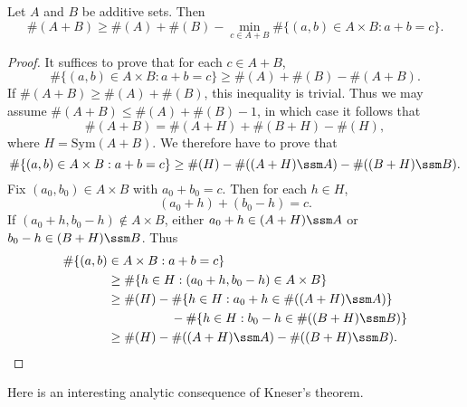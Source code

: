 \begin{theorem}
    Let $A$ and $B$ be additive sets. Then
    \[ \#(A + B) \geq \#(A) + \#(B) - \min_{c \in A + B} \# \{ (a,b) \in A \times B: a + b = c \}. \]
\end{theorem}
\begin{proof}
    It suffices to prove that for each $c \in A + B$,
    \[ \# \{ (a,b) \in A \times B: a + b = c \} \geq \#(A) + \#(B) - \#(A + B). \]
    If $\#(A + B) \geq \#(A) + \#(B)$, this inequality is trivial. Thus we may assume $\#(A + B) \leq \#(A) + \#(B) - 1$, in which case it follows that
    \[ \#(A + B) = \#(A + H) + \#(B + H) - \#(H), \]
    where $H = \text{Sym}(A + B)$. We therefore have to prove that
    \[ \# \{ (a,b) \in A \times B: a + b = c \} \geq \#(H) - \#((A + H) \ssm A) - \#((B + H) \ssm B). \]
    Fix $(a_0,b_0) \in A \times B$ with $a_0 + b_0 = c$. Then for each $h \in H$,
    \[ (a_0 + h) + (b_0 - h) = c. \]
    If $(a_0 + h, b_0 - h) \not \in A \times B$, either $a_0 + h \in (A + H) \ssm A$ or $b_0 - h \in (B + H) \ssm B$. Thus
    \begin{align*}
        \# \{ (a,b) &\in A \times B: a + b = c \}\\
        &\geq \# \{ h \in H : (a_0+h,b_0-h) \in A \times B \} \\
        &\geq \#(H) - \# \{ h \in H : a_0 + h \in \#((A + H) \ssm A) \}\\
        &\quad\quad\quad\quad\quad - \# \{ h \in H : b_0 - h \in \#((B + H) \ssm B) \}\\
        &\geq \#(H) - \#((A + H) \ssm A) - \#((B + H) \ssm B). \qedhere
    \end{align*}
\end{proof}

Here is an interesting analytic consequence of Kneser's theorem.

